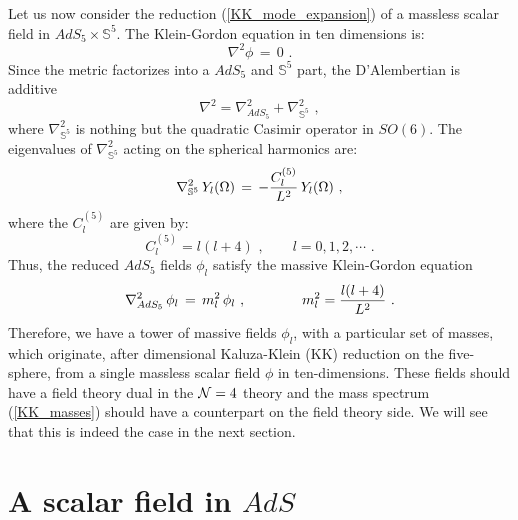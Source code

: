 \documentclass[12pt,notitlepage]{article}
\newcommand{\beq}{\begin{equation}}
\newcommand{\eeq}{\end{equation}}
\begin{document}
Let us now consider the reduction (\ref{KK_mode_expansion}) of  a massless scalar field in $AdS_5\times {\mathbb S}^5$. The Klein-Gordon equation in ten dimensions is:
\beq
\nabla^2 \phi\,=\,0\,\,.
\eeq
Since the metric factorizes into a  $AdS_5$ and ${\mathbb S}^5$ part, the D'Alembertian is additive
\beq
\nabla^2=\nabla^2_{AdS_5}+\nabla^2_{{\mathbb S}^5}\,\,,
\eeq
where $\nabla^2_{{\mathbb S}^5}$ is nothing but the quadratic Casimir operator in
$SO(6)$. The eigenvalues of $\nabla^2_{{\mathbb S}^5}$ acting on the spherical harmonics are:
\beq
\nabla^2_{{\mathbb S}^5}\,Y_l(\Omega)\,=\,-{C_l^{(5)}\over L^2}\,Y_l(\Omega)\,\,,
\eeq
where the  $C_l^{(5)}$ are given by:
\beq
C_l^{(5)}=l(l+4)\,\,,
\qquad
l=0,1,2,\cdots\,\,.
\eeq
Thus, the reduced  $AdS_5$ fields $\phi_l$ satisfy the massive Klein-Gordon equation
\beq
\nabla^2_{AdS_5}\,\phi_l\,=\,m_l^2\,\phi_l\,\,,
\qquad\qquad
m_l^2={l(l+4)\over L^2}\,\,.
\label{KK_masses}
\eeq
Therefore, we have a tower of massive fields $\phi_l$, with a particular set of masses, which originate, after  dimensional Kaluza-Klein (KK) reduction on the five-sphere,  from a single massless scalar field $\phi$ in ten-dimensions.  These fields should have a field theory dual in the ${\cal N}=4$ theory and the mass spectrum (\ref{KK_masses}) should have a counterpart on the field theory side. We will see that this is indeed the case in the next section. 



\section{A scalar field in $AdS$}
\end{document}
